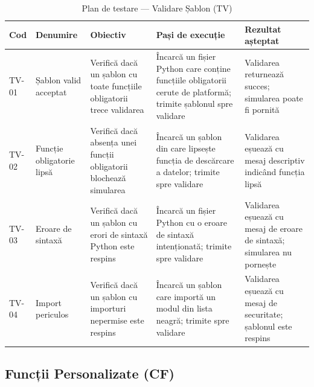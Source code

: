 \documentclass[../../main.tex]{subfiles}
\begin{document}
    \begin{table}[H]
        \centering
        \footnotesize
        \begin{tabular}{|p{}|p{}|p{}|p{}|p{}|}
            \hline
            \textbf{Cod} & \textbf{Denumire} & \textbf{Obiectiv} & \textbf{Pași de execuție} & \textbf{Rezultat așteptat} \\
            \hline
            TV-01 & Șablon valid acceptat & Verifică dacă un șablon cu toate funcțiile obligatorii trece validarea & Încarcă un fișier Python care conține funcțiile obligatorii cerute de platformă; trimite șablonul spre validare & Validarea returnează succes; simularea poate fi pornită \\
            \hline
            TV-02 & Funcție obligatorie lipsă & Verifică dacă absența unei funcții obligatorii blochează simularea & Încarcă un șablon din care lipsește funcția de descărcare a datelor; trimite spre validare & Validarea eșuează cu mesaj descriptiv indicând funcția lipsă \\
            \hline
            TV-03 & Eroare de sintaxă & Verifică dacă un șablon cu erori de sintaxă Python este respins & Încarcă un fișier Python cu o eroare de sintaxă intenționată; trimite spre validare & Validarea eșuează cu mesaj de eroare de sintaxă; simularea nu pornește \\
            \hline
            TV-04 & Import periculos & Verifică dacă un șablon cu importuri nepermise este respins & Încarcă un șablon care importă un modul din lista neagră; trimite spre validare & Validarea eșuează cu mesaj de securitate; șablonul este respins \\
            \hline
        \end{tabular}
        \caption{Plan de testare --- Validare Șablon (TV)}
        \label{tab:test_tv}
    \end{table}

    \subsection{Funcții Personalizate (CF)}
\end{document}
